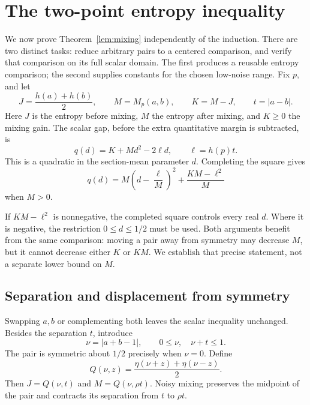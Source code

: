 \section{The two-point entropy inequality}\label{sec:product}
We now prove Theorem~\ref{lem:mixing} independently of the induction. There are two distinct tasks: reduce arbitrary pairs to a centered comparison, and verify that comparison on its full scalar domain. The first produces a reusable entropy comparison; the second supplies constants for the chosen low-noise range. Fix $p$, and let
\begin{equation}\label{eq:JKM}
J=\frac{h(a)+h(b)}2,\qquad M=M_p(a,b),\qquad K=M-J,\qquad t=|a-b|.
\end{equation}
Here $J$ is the entropy before mixing, $M$ the entropy after mixing, and $K\ge0$ the mixing gain. The scalar gap, before the extra quantitative margin is subtracted, is
\begin{equation}\label{eq:quadratic}
q(d)=K+Md^2-2\ell d,\qquad \ell=h(p)t.
\end{equation}
This is a quadratic in the section-mean parameter $d$. Completing the square gives
\begin{equation}\label{eq:square}
q(d)=M\left(d-\frac{\ell}{M}\right)^2+\frac{KM-\ell^2}{M}
\end{equation}
when $M>0$.

If $KM-\ell^2$ is nonnegative, the completed square controls every real $d$. Where it is negative, the restriction $0\le d\le1/2$ must be used. Both arguments benefit from the same comparison: moving a pair away from symmetry may decrease $M$, but it cannot decrease either $K$ or $KM$. We establish that precise statement, not a separate lower bound on $M$.

\subsection{Separation and displacement from symmetry}
Swapping $a,b$ or complementing both leaves the scalar inequality unchanged. Besides the separation $t$, introduce
\[
\nu=|a+b-1|,\qquad 0\le\nu,\quad \nu+t\le1.
\]
The pair is symmetric about $1/2$ precisely when $\nu=0$. Define
\begin{equation}\label{eq:Q}
Q(\nu,z)=\frac{\eta(\nu+z)+\eta(\nu-z)}2.
\end{equation}
Then $J=Q(\nu,t)$ and $M=Q(\nu,\rho t)$. Noisy mixing preserves the midpoint of the pair and contracts its separation from $t$ to $\rho t$.


